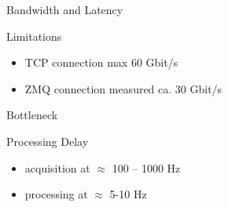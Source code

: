 \documentclass[aspectratio=169]{beamer}
\begin{document}
\begin{frame}{Bandwidth and Latency}
 \begin{block}{Limitations}
  \begin{itemize}
   \item TCP connection max 60 Gbit/s
   \item ZMQ connection measured ca. 30 Gbit/s
  \end{itemize}
 \end{block}

 \begin{block}{Bottleneck}
 \end{block}

 \begin{block}{Processing Delay}
  \begin{itemize}
   \item acquisition at $\approx$ 100 -- 1000 Hz
   \item processing at $\approx$ 5-10 Hz
  \end{itemize}

 \end{block}
\end{frame}
\end{document}
